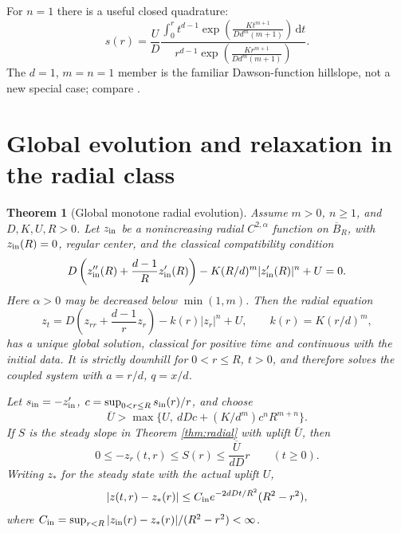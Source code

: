 \documentclass[11pt,a4paper]{article}
\newtheorem{theorem}{Theorem}[section]
\theoremstyle{definition}\newtheorem{definition}[theorem]{Definition}
\theoremstyle{remark}\newtheorem{remark}[theorem]{Remark}
\newcommand{\dd}{\,\mathrm d}
\newcommand{\cl}{\overline}
\begin{document}
For $n=1$ there is a useful closed quadrature:
\begin{equation}
 s(r)=\frac UD\frac{\displaystyle\int_0^r t^{d-1}
 \exp\!\left(\frac{Kt^{m+1}}{Dd^m(m+1)}\right)\dd t}
 {\displaystyle r^{d-1}\exp\!\left(\frac{Kr^{m+1}}{Dd^m(m+1)}\right)}.\label{eq:quadrature}
\end{equation}
The $d=1$, $m=n=1$ member is the familiar Dawson-function hillslope, not a new special case; compare \cite{Bonetti2020,Anand2023}.

\section{Global evolution and relaxation in the radial class}
\begin{theorem}[Global monotone radial evolution]\label{thm:dynamic}
Assume $m>0$, $n\geq1$, and $D,K,U,R>0$. Let $z_{\rm in}$ be a nonincreasing radial $C^{2,\alpha}$ function on $\cl B_R$, with $z_{\rm in}(R)=0$, regular center, and the classical compatibility condition
\[
 D\left(z_{\rm in}''(R)+\frac{d-1}{R}z_{\rm in}'(R)\right)
 -K(R/d)^m|z_{\rm in}'(R)|^n+U=0.
\]
Here $\alpha>0$ may be decreased below $\min(1,m)$. Then the radial equation
\begin{equation}
 z_t=D\left(z_{rr}+\frac{d-1}{r}z_r\right)-k(r)|z_r|^n+U,
 \qquad k(r)=K(r/d)^m,\label{eq:radialtime}
\end{equation}
has a unique global solution, classical for positive time and continuous with the initial data. It is strictly downhill for $0<r\leq R$, $t>0$, and therefore solves the coupled system with $a=r/d$, $q=x/d$.

Let $s_{\rm in}=-z_{\rm in}'$, $c=\sup_{0<r\leq R}s_{\rm in}(r)/r$, and choose
\begin{equation}
 \overline U>\max\{U,\ dDc+(K/d^m)c^nR^{m+n}\}.\label{eq:Ubar}
\end{equation}
If $S$ is the steady slope in Theorem \ref{thm:radial} with uplift $\overline U$, then
\begin{equation}
 0\leq -z_r(t,r)\leq S(r)\leq\frac{\overline U}{dD}r\qquad(t\geq0).\label{eq:globalgrad}
\end{equation}
Writing $z_*$ for the steady state with the actual uplift $U$,
\begin{equation}
 |z(t,r)-z_*(r)|\leq C_{\rm in}e^{-2dDt/R^2}(R^2-r^2),\label{eq:rate}
\end{equation}
where $C_{\rm in}=\sup_{r<R}|z_{\rm in}(r)-z_*(r)|/(R^2-r^2)<\infty$.
\end{theorem}
\end{document}
